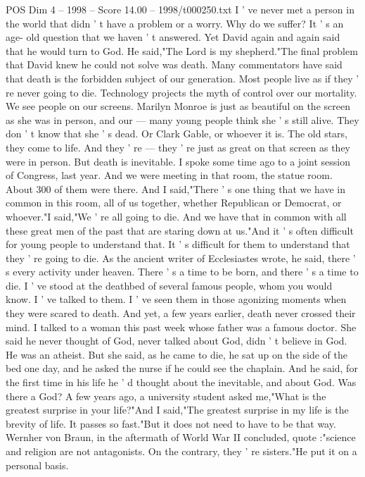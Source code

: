 \begin{textsample}{POS Dim 4 – 1998 – Score 14.00 – 1998/t000250.txt}
I ' ve never met a person in the world that didn ' t have a problem or a worry.
Why do we suffer?
It ' s an age- old question that we haven ' t answered.
Yet David again and again said that he would turn to God.
He said,"The Lord is my shepherd."The final problem that David knew he could not solve was death.
Many commentators have said that death is the forbidden subject of our generation.
Most people live as if they ' re never going to die.
Technology projects the myth of control over our mortality.
We see people on our screens.
Marilyn Monroe is just as beautiful on the screen as she was in person, and our — many young people think she ' s still alive.
They don ' t know that she ' s dead.
Or Clark Gable, or whoever it is.
The old stars, they come to life.
And they ' re — they ' re just as great on that screen as they were in person.
But death is inevitable.
I spoke some time ago to a joint session of Congress, last year.
And we were meeting in that room, the statue room.
About 300 of them were there.
And I said,"There ' s one thing that we have in common in this room, all of us together, whether Republican or Democrat, or whoever."I said,"We ' re all going to die.
And we have that in common with all these great men of the past that are staring down at us."And it ' s often difficult for young people to understand that.
It ' s difficult for them to understand that they ' re going to die.
As the ancient writer of Ecclesiastes wrote, he said, there ' s every activity under heaven.
There ' s a time to be born, and there ' s a time to die.
I ' ve stood at the deathbed of several famous people, whom you would know.
I ' ve talked to them.
I ' ve seen them in those agonizing moments when they were scared to death.
And yet, a few years earlier, death never crossed their mind.
I talked to a woman this past week whose father was a famous doctor.
She said he never thought of God, never talked about God, didn ' t believe in God.
He was an atheist.
But she said, as he came to die, he sat up on the side of the bed one day, and he asked the nurse if he could see the chaplain.
And he said, for the first time in his life he ' d thought about the inevitable, and about God.
Was there a God?
A few years ago, a university student asked me,"What is the greatest surprise in your life?"And I said,"The greatest surprise in my life is the brevity of life.
It passes so fast."But it does not need to have to be that way.
Wernher von Braun, in the aftermath of World War II concluded, quote :"science and religion are not antagonists.
On the contrary, they ' re sisters."He put it on a personal basis.

\end{textsample}
